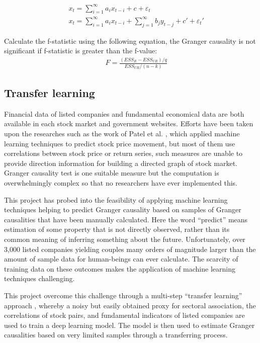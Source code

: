 \begin{eqnarray}
&&	x_t=\sum_{i=1}^{\infty}a_ix_{t-i}+c+\varepsilon_{t}\\
&&x_t=\sum_{i=1}^{\infty}a_ix_{t-i}+\sum_{j=1}^{\infty}b_jy_{t-j}+c'+\varepsilon_{t}'
\end{eqnarray}

Calculate the f-statistic using the following equation, the Granger causality is not significant if f-statistic is greater than the f-value:
\begin{eqnarray}
&&	F=\frac{(ESS_R-ESS_{UR})/q}{ESS_{UR}/(n-k)}
\end{eqnarray}

\subsection{Transfer learning}
Financial data of listed companies and fundamental economical data are both available in each stock market and government websites. Efforts have been taken upon the researches such as the work of Patel et al. \cite{patel2015predicting}, which applied machine learning techniques to predict stock price movement, but most of them use correlations between stock price or return series, such measures are unable to provide direction information for building a directed graph of stock market. Granger causality test is one suitable measure but the computation is overwhelmingly complex so that no researchers have ever implemented this.

This project has probed into the feasibility of applying machine learning techniques helping to predict Granger causality based on samples of Granger causalities that have been manually calculated. Here the word “predict” means estimation of some property that is not directly observed, rather than its common meaning of inferring something about the future. Unfortunately, over 3,000 listed companies yielding couples many orders of magnitude larger than the amount of sample data for human-beings can ever calculate. The scarcity of training data on these outcomes makes the application of machine learning techniques challenging.

This project overcome this challenge through a multi-step “transfer learning” approach \cite{pan2010survey}, whereby a noisy but easily obtained proxy for sectoral association, the correlations of stock pairs, and fundamental indicators of listed companies are used to train a deep learning model. The model is then used to estimate Granger causalities based on very limited samples through a transferring process.

